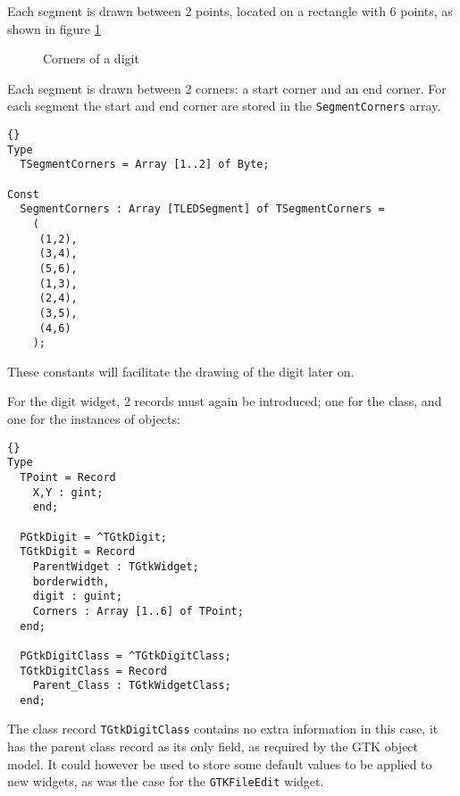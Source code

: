 \documentclass[10pt]{article}
\begin{document}
Each segment is drawn between 2 points, located on a rectangle
with 6 points, as shown in figure \ref{fig:corners}
\begin{figure}
\begin{center}
\caption{Corners of a digit}\label{fig:corners}
\end{center}
\end{figure}
Each segment is drawn between 2 corners: a start corner and an end corner.
For each segment the start and end corner are stored in the 
\lstinline|SegmentCorners| array.
\begin{lstlisting}{}
Type
  TSegmentCorners = Array [1..2] of Byte;

Const
  SegmentCorners : Array [TLEDSegment] of TSegmentCorners = 
    (
     (1,2),
     (3,4),
     (5,6),
     (1,3),
     (2,4),
     (3,5),
     (4,6)
    );
\end{lstlisting}
These constants will facilitate the drawing of the digit later on. 

For the digit widget, 2 records must again be introduced; one for the class,
and one for the instances of objects:
\begin{lstlisting}{}
Type
  TPoint = Record 
    X,Y : gint;
    end;

  PGtkDigit = ^TGtkDigit;  
  TGtkDigit = Record 
    ParentWidget : TGtkWidget;
    borderwidth,
    digit : guint;
    Corners : Array [1..6] of TPoint;
  end;
  
  PGtkDigitClass = ^TGtkDigitClass;
  TGtkDigitClass = Record
    Parent_Class : TGtkWidgetClass;
  end;
\end{lstlisting}
The class record \lstinline|TGtkDigitClass| contains no extra information
in this case, it has the parent class record as its only field, as required 
by the GTK object model. It could however be used to store some default values to 
be applied to new widgets, as was the case for the \lstinline|GTKFileEdit|
widget.
\end{document}
